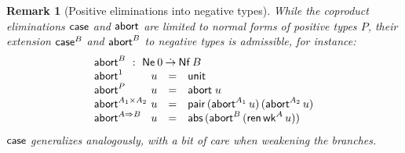 \documentclass[sigplan,screen,fleqn,review]{acmart} %
\newtheorem{remark}{Remark}
\begin{document}
\begin{remark}[Positive eliminations into negative types]
\label{rem:abort}
While the coproduct eliminations $\mathsf{case}$ and $\mathsf{abort}$ are limited to
normal forms of positive types $P$, their extension $\mathsf{case}^B$ and
$\mathsf{abort}^B$ to negative types
is admissible, for instance:
\[
\begin{array}{l@{~}lcl}
  \multicolumn 4 l {\tabort^B ~:~ \tNe\, 0 \todot \tNf\,B} \\
  \tabort^{\tyone}     & u & = & \tunit \\
  \tabort^P           & u & = & \tabort\;u \\
  \tabort^{A_1 \times A_2} & u & = & \tpair\,(\tabort^{A_1}\,u)\,(\tabort^{A_2}\,u) \\
  \tabort^{A \To B}    & u & = & \tabs\,(\tabort^B\,(\tren\,\twk^A\,u)) \\
\end{array}
\]
$\mathsf{case}$ generalizes analogously, with a bit of care when weakening
the branches.
\end{remark}




\end{document}

